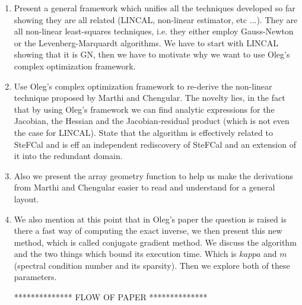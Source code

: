 \documentclass[a4paper,fleqn,usenatbib]{mnras}
\begin{document}
\begin{enumerate}
 \item Present a general framework which unifies all the techniques developed so far showing they are all related (LINCAL, non-linear estimator, etc ...). They are all non-linear
 least-squares techniques, i.e. they either employ Gauss-Newton or the Levenberg-Marquardt algorithms. We have to start with LINCAL showing that it is GN, then we have to motivate 
 why we want to use Oleg's complex optimization framework.
 \item Use Oleg's complex optimization framework to re-derive the non-linear technique proposed by Marthi and Chengular. The novelty lies, in the fact that by using Oleg's
 framework we can find analytic expressions for the Jacobian, the Hessian and the Jacobian-residual product (which is not even the case for LINCAL). State that the algorithm is 
 effectively related to SteFCal and is eff an independent rediscovery of SteFCal and an extension of it into the redundant domain.
 \item Also we present the array geometry function to help us make the derivations from Marthi and Chengular easier to read and understand for a general layout.
 \item We also mention at this point that in Oleg's paper the question is raised is there a fast way of computing the exact inverse, we then present this new method, which is called
 conjugate gradient method. We discuss the algorithm and the two things which bound its execution time. Which is $kappa$ and $m$ (spectral condition number and its sparsity). Then
 we explore both of these parameters.
 
 **************
 FLOW OF PAPER
 **************
 

\end{enumerate}
\end{document}
